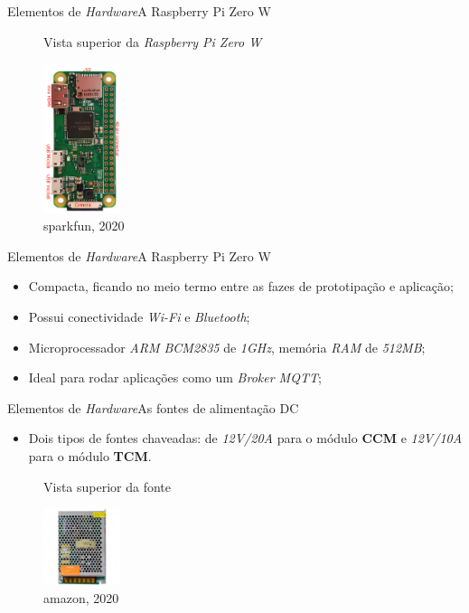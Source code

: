 \begin{frame}{Elementos de \textit{Hardware}}{A Raspberry Pi Zero W}
    \begin{figure}[H]
        \centering
        \caption{Vista superior da \textit{Raspberry Pi Zero W}}
        \includegraphics[width=0.2\textwidth, angle = 90]{figuras/rasp_zerow.png}
        \caption*{\tiny{sparkfun, 2020}}
        \label{fig:rasppizerow}
    \end{figure} 

\end{frame}

\begin{frame}{Elementos de \textit{Hardware}}{A Raspberry Pi Zero W}
    \begin{itemize}
        \item Compacta, ficando no meio termo entre as fazes de prototipação e aplicação;
        \item Possui conectividade \textit{Wi-Fi} e \textit{Bluetooth};
        \item Microprocessador \textit{ARM BCM2835} de \textit{1GHz}, memória \textit{RAM} de \textit{512MB};
        \item Ideal para rodar aplicações como um \textit{Broker MQTT};
    \end{itemize}

\end{frame}

\begin{frame}{Elementos de \textit{Hardware}}{As fontes de alimentação DC}
    \begin{itemize}
        \item Dois tipos de fontes chaveadas: de \textit{12V/20A} para o módulo \textbf{CCM} e \textit{12V/10A} para o módulo \textbf{TCM}.
    \end{itemize}

    \begin{figure}[H]
        \centering
        \caption{Vista superior da fonte}
        \includegraphics[width=0.2\textwidth]{figuras/fonte_chaveada.jpg}
        \caption*{\tiny{amazon, 2020}}
        \label{fig:fontechaveada}
    \end{figure} 

\end{frame}


